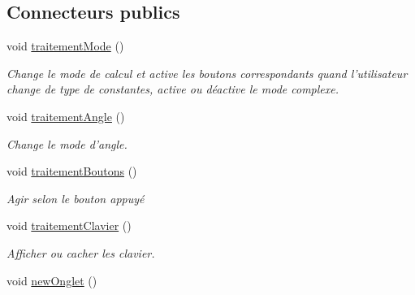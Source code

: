 \subsection*{Connecteurs publics}
\begin{DoxyCompactItemize}
\item 
\hypertarget{class_onglet_a483593c077f1867feb1d79e86a70d1fd}{void \hyperlink{class_onglet_a483593c077f1867feb1d79e86a70d1fd}{traitement\-Mode} ()}\label{class_onglet_a483593c077f1867feb1d79e86a70d1fd}

\begin{DoxyCompactList}\small\item\em Change le mode de calcul et active les boutons correspondants quand l'utilisateur change de type de constantes, active ou déactive le mode complexe. \end{DoxyCompactList}\item 
\hypertarget{class_onglet_a08179a7a267b0f8a0cc18008b1385fae}{void \hyperlink{class_onglet_a08179a7a267b0f8a0cc18008b1385fae}{traitement\-Angle} ()}\label{class_onglet_a08179a7a267b0f8a0cc18008b1385fae}

\begin{DoxyCompactList}\small\item\em Change le mode d'angle. \end{DoxyCompactList}\item 
\hypertarget{class_onglet_ab77c8b306abc044025f1112e90c546f0}{void \hyperlink{class_onglet_ab77c8b306abc044025f1112e90c546f0}{traitement\-Boutons} ()}\label{class_onglet_ab77c8b306abc044025f1112e90c546f0}

\begin{DoxyCompactList}\small\item\em Agir selon le bouton appuyé \end{DoxyCompactList}\item 
\hypertarget{class_onglet_a6fa52eb0489ba767dc4ecf6776c6d8ff}{void \hyperlink{class_onglet_a6fa52eb0489ba767dc4ecf6776c6d8ff}{traitement\-Clavier} ()}\label{class_onglet_a6fa52eb0489ba767dc4ecf6776c6d8ff}

\begin{DoxyCompactList}\small\item\em Afficher ou cacher les clavier. \end{DoxyCompactList}\item 
\hypertarget{class_onglet_a6cf54809c9359f5b2b97b273fde77e05}{void \hyperlink{class_onglet_a6cf54809c9359f5b2b97b273fde77e05}{new\-Onglet} ()}\label{class_onglet_a6cf54809c9359f5b2b97b273fde77e05}


\end{DoxyCompactItemize}
